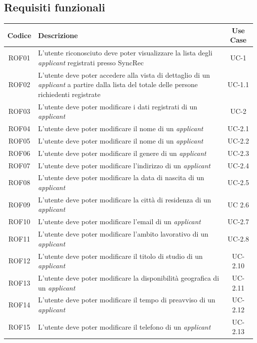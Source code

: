 \subsection{Requisiti funzionali}
\begin{center}
	\begin{tabularx}{\textwidth}{|c|X|c|}
		\hline
		\textbf{Codice} & \textbf{Descrizione} & \textbf{Use Case} \\
		\hline
		\endhead
		ROF01 & L'utente riconosciuto deve poter visualizzare la lista degli \textit{applicant} registrati presso SyncRec & UC-1 \\
		\hline
		ROF02 & L'utente deve poter accedere alla vista di dettaglio di un \textit{applicant} a partire dalla lista del totale delle persone richiedenti registrate & UC-1.1 \\
		\hline
		ROF03 & L'utente deve poter modificare i dati registrati di un \textit{applicant} & UC-2 \\
		\hline
		ROF04 & L'utente deve poter modificare il nome di un \textit{applicant} & UC-2.1 \\
		\hline
		ROF05 & L'utente deve poter modificare il nome di un \textit{applicant} & UC-2.2 \\
		\hline
		ROF06 & L'utente deve poter modificare il genere di un \textit{applicant} & UC-2.3\\
		\hline
		ROF07 & L'utente deve poter modificare l'indirizzo di un \textit{applicant} & UC-2.4 \\
		\hline
		ROF08 &  L'utente deve poter modificare la data di nascita di un \textit{applicant} & UC-2.5 \\
		\hline
		ROF09 & L'utente deve poter modificare la città di residenza di un \textit{applicant} & UC 2.6 \\
		\hline
		ROF10 & L'utente deve poter modificare l'email di un \textit{applicant} & UC-2.7\\
		\hline
		ROF11 & L'utente deve poter modificare l'ambito lavorativo di un \textit{applicant} &  UC-2.8\\
		\hline
		ROF12 & L'utente deve poter modificare il titolo di studio di un \textit{applicant} & UC-2.10 \\
		\hline
		ROF13 & L'utente deve poter modificare la disponibilità geografica di un \textit{applicant} & UC-2.11\\
		\hline
		ROF14 & L'utente deve poter modificare il tempo di preavviso di un \textit{applicant} & UC-2.12\\
		\hline
		ROF15 & L'utente deve poter modificare il telefono di un \textit{applicant} & UC-2.13 \\

\end{tabularx}
\end{center}
